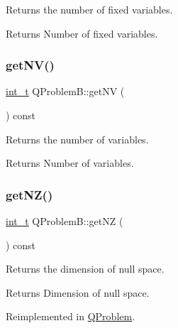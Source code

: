 Returns the number of fixed variables. \begin{DoxyReturn}{Returns}
Number of fixed variables. 
\end{DoxyReturn}
\mbox{\label{class_q_problem_b_a8bfcd5a9acddbe43a0574f86c6339a33}} 
\subsubsection{\texorpdfstring{get\+N\+V()}{getNV()}}
{\footnotesize\ttfamily \hyperlink{_types_8hpp_ab6fd6105e64ed14a0c9281326f05e623}{int\+\_\+t} Q\+Problem\+B\+::get\+NV (\begin{DoxyParamCaption}{ }\end{DoxyParamCaption}) const\hspace{0.3cm}{\ttfamily [inline]}}

Returns the number of variables. \begin{DoxyReturn}{Returns}
Number of variables. 
\end{DoxyReturn}
\mbox{\label{class_q_problem_b_a3495286868b8a38e788700ad0e64fbc4}} 
\subsubsection{\texorpdfstring{get\+N\+Z()}{getNZ()}}
{\footnotesize\ttfamily \hyperlink{_types_8hpp_ab6fd6105e64ed14a0c9281326f05e623}{int\+\_\+t} Q\+Problem\+B\+::get\+NZ (\begin{DoxyParamCaption}{ }\end{DoxyParamCaption}) const\hspace{0.3cm}{\ttfamily [virtual]}}

Returns the dimension of null space. \begin{DoxyReturn}{Returns}
Dimension of null space. 
\end{DoxyReturn}


Reimplemented in \hyperlink{class_q_problem_abc038fbdddcb04db736cdd3fab4d9a1a}{Q\+Problem}.

\mbox{\label{class_q_problem_b_a067695062de64eb612ba1d0e1cfaac45}} 
